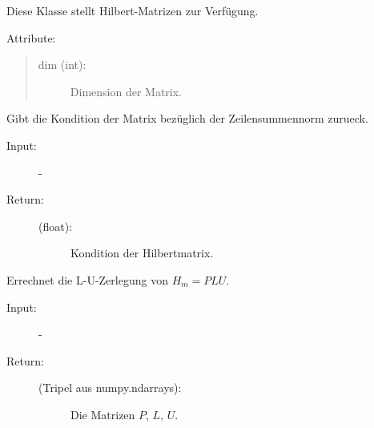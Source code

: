 \documentclass[letterpaper,10pt,ngerman, oneside, openright]{sphinxmanual}
\begin{document}
\begin{fulllineitems}
\label{\detokenize{index:hilbertmatr.Hilbert}}
Diese Klasse stellt Hilbert-Matrizen zur Verfügung.

Attribute:
\begin{quote}
\begin{description}
\item[{dim (int):}] \leavevmode
Dimension der Matrix.

\end{description}
\end{quote}

\begin{fulllineitems}
\label{\detokenize{index:hilbertmatr.Hilbert.kond_hil_zs}}
Gibt die Kondition der Matrix bezüglich der Zeilensummennorm zurueck.

\begin{description}
\item [{Input:}] -
\end{description}
\begin{description}
\item[{Return:}] \leavevmode\begin{description}
\item[{(float):}] \leavevmode
Kondition der Hilbertmatrix.

\end{description}

\end{description}

\end{fulllineitems}


\begin{fulllineitems}
\label{\detokenize{index:hilbertmatr.Hilbert.l_u_zerl}}
Errechnet die L-U-Zerlegung von $H_m=PLU$.

\begin{description}
\item [{Input:}] -
\end{description}
\begin{description}
\item[{Return:}] \leavevmode\begin{description}
\item[{(Tripel aus numpy.ndarrays):}] \leavevmode
Die Matrizen $P$, $L$, $U$.


\end{description}
\end{description}
\end{fulllineitems}
\end{fulllineitems}
\end{document}
